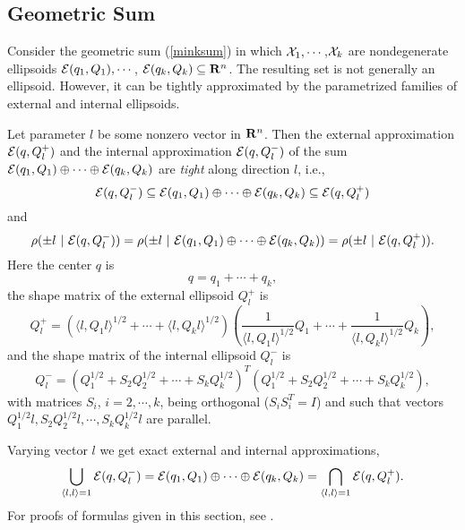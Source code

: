 \subsection{Geometric Sum}
Consider the geometric sum (\ref{minksum}) in which $\XX_1,\cdots$,$\XX_k$
are  nondegenerate ellipsoids
$\EE(q_1,Q_1),\cdots$, $\EE(q_k,Q_k)\subseteq{\bf R}^n$.
The resulting set is not generally  an ellipsoid.
However, it can be tightly approximated by the parametrized families
of external and internal ellipsoids.

Let parameter $l$ be some nonzero vector in ${\bf R}^n$. Then the external
approximation $\EE(q,Q_l^+)$ and the internal approximation $\EE(q,Q_l^-)$
of the sum $\EE(q_1,Q_1)\oplus\cdots\oplus\EE(q_k,Q_k)$ are \emph{tight} along
direction $l$, i.e.,
\[ \EE(q,Q_l^-)\subseteq\EE(q_1,Q_1)\oplus\cdots\oplus\EE(q_k,Q_k)
\subseteq\EE(q,Q_l^+) \]
and
\[ \rho(\pm l ~|~ \EE(q,Q_l^-)) =
\rho(\pm l ~|~ \EE(q_1,Q_1)\oplus\cdots\oplus\EE(q_k,Q_k)) =
\rho(\pm l ~|~ \EE(q,Q_l^+)).\]
Here the center $q$ is
\begin{equation}
q = q_1 + \cdots + q_k , \label{minksum_c}
\end{equation}
the shape matrix of the external ellipsoid $Q_l^+$ is
\begin{equation}
Q_l^+ = \left(\langle l,Q_1l\rangle^{1/2} + \cdots
+ \langle l,Q_kl\rangle^{1/2}\right)
\left(\frac{1}{\langle l,Q_1l\rangle^{1/2}}Q_1 + \cdots +
\frac{1}{\langle l,Q_kl\rangle^{1/2}}Q_k\right), \label{minksum_ea}
\end{equation}
and the shape matrix of the internal ellipsoid $Q_l^-$ is
\begin{equation}
Q_l^- = \left(Q_1^{1/2} + S_2Q_2^{1/2} + \cdots + S_kQ_k^{1/2}\right)^T
\left(Q_1^{1/2} + S_2Q_2^{1/2} + \cdots + S_kQ_k^{1/2}\right),\label{minksum_ia}
\end{equation}
with matrices $S_i$, $i=2,\cdots,k$, being orthogonal ($S_iS_i^T=I$) and such
that vectors $Q_1^{1/2}l, S_2Q_2^{1/2}l, \cdots, S_kQ_k^{1/2}l$ are parallel.

Varying vector $l$ we get exact external and internal approximations,
\[ \bigcup_{\langle l,l\rangle=1} \EE(q,Q_l^-) =
\EE(q_1,Q_1)\oplus\cdots\oplus\EE(q_k,Q_k) =
\bigcap_{\langle l,l\rangle=1} \EE(q,Q_l^+) .\]
For proofs of formulas given in this section, see \cite{kurvalyi, kurvar01}.

